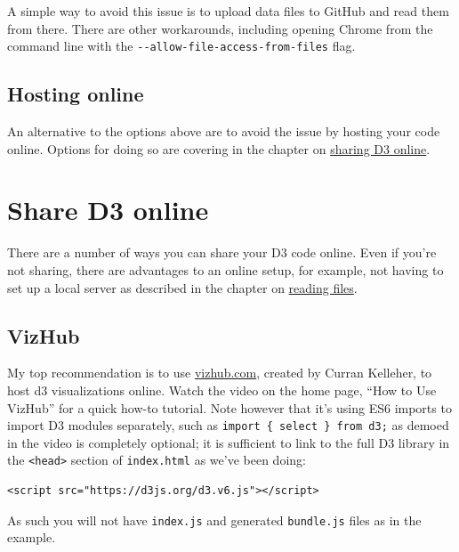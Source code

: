 \documentclass[
  openany]{book}
\begin{document}
A simple way to avoid this issue is to upload data files to GitHub and read them from there. There are other workarounds, including opening Chrome from the command line with the \texttt{-\/-allow-file-access-from-files} flag.

\hypertarget{hosting-online}{%
\section{Hosting online}\label{hosting-online}}

An alternative to the options above are to avoid the issue by hosting your code online. Options for doing so are covering in the chapter on \href{share-d3-online.html}{sharing D3 online}.

\hypertarget{share-d3-online}{%
\chapter{\texorpdfstring{Share D3 online }{Share D3 online }}\label{share-d3-online}}

There are a number of ways you can share your D3 code online. Even if you're not sharing, there are advantages to an online setup, for example, not having to set up a local server as described in the chapter on \href{reading-files.html}{reading files}.

\hypertarget{vizhub}{%
\section{VizHub}\label{vizhub}}

My top recommendation is to use \href{http://www.vizhub.com}{vizhub.com}, created by Curran Kelleher, to host d3 visualizations online. Watch the video on the home page, ``How to Use VizHub'' for a quick how-to tutorial. Note however that it's using ES6 imports to import D3 modules separately, such as \texttt{import\ \{\ select\ \}\ from\ \textquotesingle{}d3\textquotesingle{};} as demoed in the video is completely optional; it is sufficient to link to the full D3 library in the \texttt{\textless{}head\textgreater{}} section of \texttt{index.html} as we've been doing:

\begin{verbatim}
<script src="https://d3js.org/d3.v6.js"></script>
\end{verbatim}

As such you will not have \texttt{index.js} and generated \texttt{bundle.js} files as in the example.
\end{document}
